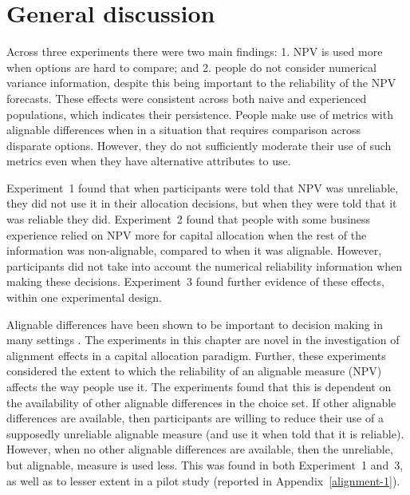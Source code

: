 \documentclass[a4paper, nobind, dvipsnames]{templates/ociamthesis}
\theoremstyle{definition}
\theoremstyle{definition}
\theoremstyle{definition}
\theoremstyle{definition}
\theoremstyle{remark}
\begin{document}
\section{General discussion}

Across three experiments there were two main findings: 1. NPV is used more when
options are hard to compare; and 2. people do not consider numerical variance
information, despite this being important to the reliability of the NPV
forecasts. These effects were consistent across both naive and experienced
populations, which indicates their persistence. People make use of metrics with
alignable differences when in a situation that requires comparison across
disparate options. However, they do not sufficiently moderate their use of such
metrics even when they have alternative attributes to use.

Experiment~1 found that when participants were told that NPV was unreliable,
they did not use it in their allocation decisions, but when they were told that
it was reliable they did. Experiment~2 found that people with some business
experience relied on NPV more for capital allocation when the rest of the
information was non-alignable, compared to when it was alignable. However,
participants did not take into account the numerical reliability information
when making these decisions. Experiment~3 found further evidence of these
effects, within one experimental design.

Alignable differences have been shown to be important to decision making in many
settings \autocite{markman2010,markman1995}. The experiments in this chapter are novel
in the investigation of alignment effects in a capital allocation paradigm.
Further, these experiments considered the extent to which the reliability of an
alignable measure (NPV) affects the way people use it. The experiments found
that this is dependent on the availability of other alignable differences in the
choice set. If other alignable differences are available, then participants are
willing to reduce their use of a supposedly unreliable alignable measure (and
use it when told that it is reliable). However, when no other alignable
differences are available, then the unreliable, but alignable, measure is used
less. This was found in both Experiment~1 and~3, as well as to lesser extent in
a pilot study (reported in Appendix~\ref{alignment-1}).
\end{document}
